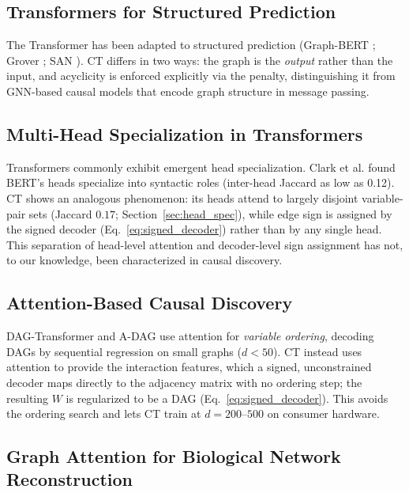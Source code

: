 \documentclass[12pt,a4paper]{article}
\begin{document}
\subsection{Transformers for Structured Prediction}

The Transformer \cite{vaswani2017attention} has been adapted to structured prediction (Graph-BERT \cite{zhang2020graph}; Grover \cite{rong2020self}; SAN \cite{kreuzer2021rethinking}). CT differs in two ways: the graph is the \emph{output} rather than the input, and acyclicity is enforced explicitly via the penalty, distinguishing it from GNN-based causal models that encode graph structure in message passing.

\subsection{Multi-Head Specialization in Transformers}

Transformers commonly exhibit emergent head specialization. Clark et al. \cite{clark2019does} found BERT's heads specialize into syntactic roles (inter-head Jaccard as low as 0.12). CT shows an analogous phenomenon: its heads attend to largely disjoint variable-pair sets (Jaccard $0.17$; Section~\ref{sec:head_spec}), while edge sign is assigned by the signed decoder (Eq.~\ref{eq:signed_decoder}) rather than by any single head. This separation of head-level attention and decoder-level sign assignment has not, to our knowledge, been characterized in causal discovery.

\subsection{Attention-Based Causal Discovery}

DAG-Transformer \cite{lorch2022gadget} and A-DAG \cite{ke2023learning} use attention for \emph{variable ordering}, decoding DAGs by sequential regression on small graphs ($d<50$). CT instead uses attention to provide the interaction features, which a signed, unconstrained decoder maps directly to the adjacency matrix with no ordering step; the resulting $W$ is regularized to be a DAG (Eq.~\ref{eq:signed_decoder}). This avoids the ordering search and lets CT train at $d=200$--$500$ on consumer hardware.

\subsection{Graph Attention for Biological Network Reconstruction}
\end{document}
